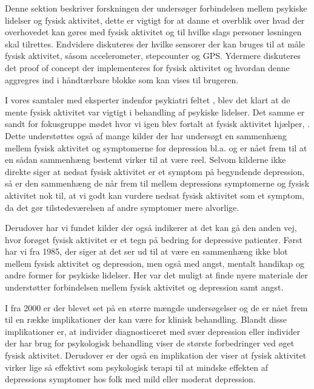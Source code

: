 Denne sektion beskriver forskningen der undersøger forbindelsen mellem psykiske lidelser og fysisk aktivitet, dette er vigtigt for at danne et overblik over hvad der overhovedet kan gøres med fysisk aktivitet og til hvilke slags personer løsningen skal tilrettes.
Endvidere diskuteres der hvilke sensorer der kan bruges til at måle fysisk aktivitet, såsom accelerometer, stepcounter og GPS.
Ydermere diskuteres det proof of concept der implementeres for fysisk aktivitet og hvordan denne aggregres ind i håndtærbare blokke som kan vises til brugeren. 

I vores samtaler med eksperter indenfor psykiatri feltet \citep[Kapitel 1, Sektion 3 og 4]{misc:faellesrapp}, blev det klart at de mente fysisk aktivitet var vigtigt i behandling af psykiske lidelser.
Det samme er sandt for fokusgruppe mødet hvor vi igen blev fortalt at fysisk aktivitet hjælper, \citep[Kapitel 1, Sektion 5]{misc:faellesrapp}.
Dette understøttes også af mange kilder der har undersøgt en sammenhæng mellem fysisk aktivitet og symptomerne for depression bl.a. \citep{art:physDepSymptoms, Strawbridge15082002, Arredondo01072012} og er nået frem til at en sådan sammenhæng bestemt virker til at være reel.
Selvom kilderne ikke direkte siger at nedsat fysisk aktivitet er et symptom på begyndende depression, så er den sammenhæng de når frem til mellem depressions symptomerne og fysisk aktivitet nok til, at vi godt kan vurdere nedsat fysisk aktivitet som et symptom, da det gør tilstedeværelsen af andre symptomer mere alvorlige.

Derudover har vi fundet kilder der også indikerer at det kan gå den anden vej, hvor forøget fysisk aktivitet er et tegn på bedring for depressive patienter.
Først har vi \citet{misc:healthReports} fra 1985, der siger at det ser ud til at være en sammenhæng ikke blot mellem fysisk aktivitet og depression, men også med angst, mentalt handikap og andre former for psykiske lidelser.
Her var det muligt at finde nyere materiale der understøtter forbindelsen mellem fysisk aktivitet og depression samt angst.

I \citet{art:physMental} fra 2000 er der blevet set på en større mængde undersøgelser og de er nået frem til en række implikationer der kan være for klinisk behandling.
Blandt disse implikationer er, at individer diagnosticeret med svær depression eller individer der har brug for psykologisk behandling viser de største forbedringer ved øget fysisk aktivitet.
Derudover er der også en implikation der viser at fysisk aktivitet virker lige så effektivt som psykologisk terapi til at mindske effekten af depressions symptomer hos folk med mild eller moderat depression.

